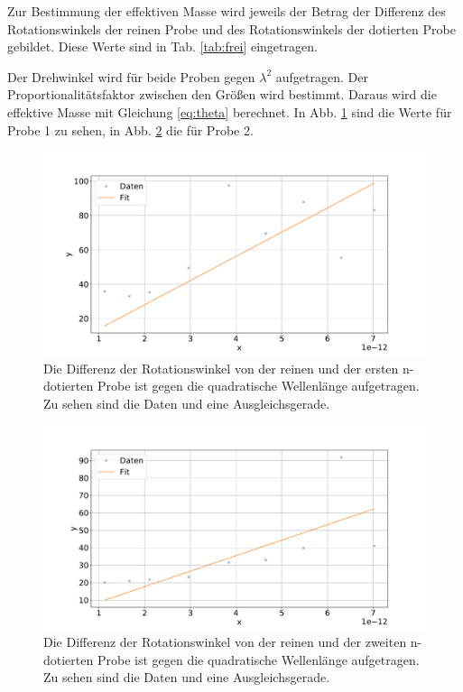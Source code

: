 Zur Bestimmung der effektiven Masse wird jeweils der Betrag der Differenz des Rotationswinkels der reinen Probe und des Rotationswinkels der dotierten Probe gebildet. Diese Werte sind in Tab. \ref{tab:frei} eingetragen.



Der Drehwinkel wird für beide Proben gegen $\lambda^2$ aufgetragen. Der Proportionalitätsfaktor zwischen den Größen wird bestimmt. Daraus wird die effektive Masse mit Gleichung \ref{eq:theta} berechnet. In Abb. \ref{fig:probe1} sind die Werte für Probe 1 zu sehen, in Abb. \ref{fig:probe2} die für Probe 2.
\begin{figure}
    \centering
    \includegraphics[width=15cm]{plots/Probe1.pdf}
    \caption{Die Differenz der Rotationswinkel von der reinen und der ersten n-dotierten Probe ist gegen die quadratische Wellenlänge aufgetragen. Zu sehen sind die Daten und eine Ausgleichsgerade.}
    \label{fig:probe1}
\end{figure}

\begin{figure}
    \centering
    \includegraphics[width=15cm]{plots/Probe2.pdf}
    \caption{Die Differenz der Rotationswinkel von der reinen und der zweiten n-dotierten Probe ist gegen die quadratische Wellenlänge aufgetragen. Zu sehen sind die Daten und eine Ausgleichsgerade.}
    \label{fig:probe2}
\end{figure}

